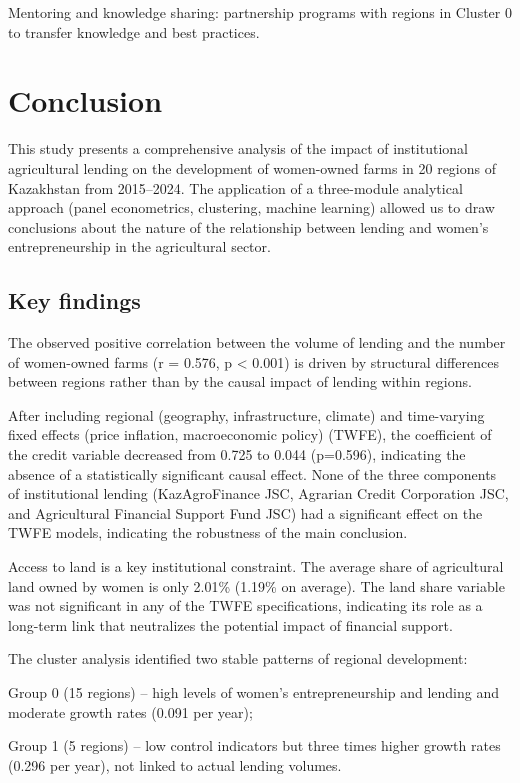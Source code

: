 ﻿\documentclass[pdflatex,sn-mathphys-ay]{sn-jnl}
\begin{document}
Mentoring and knowledge sharing: partnership programs with regions in
Cluster 0 to transfer knowledge and best practices.

\section{Conclusion}

This study presents a comprehensive analysis of the impact of
institutional agricultural lending on the development of women-owned
farms in 20 regions of Kazakhstan from 2015--2024. The
application of a three-module analytical approach (panel econometrics,
clustering, machine learning) allowed us to draw conclusions about the
nature of the relationship between lending and women's entrepreneurship
in the agricultural sector.

\subsection{Key findings}

The observed positive correlation between the volume of lending and the
number of women-owned farms (r = 0.576, p \textless{} 0.001) is driven
by structural differences between regions rather than by the causal
impact of lending within regions.

After including regional (geography, infrastructure, climate) and
time-varying fixed effects (price inflation, macroeconomic policy)
(TWFE), the coefficient of the credit variable decreased from 0.725 to
0.044 (p=0.596), indicating the absence of a statistically significant
causal effect. None of the three components of institutional lending
(KazAgroFinance JSC, Agrarian Credit Corporation JSC, and Agricultural
Financial Support Fund JSC) had a significant effect on the TWFE models,
indicating the robustness of the main conclusion.

Access to land is a key institutional constraint. The average share of
agricultural land owned by women is only 2.01\% (1.19\% on average). The
land share variable was not significant in any of the TWFE
specifications, indicating its role as a long-term link that neutralizes
the potential impact of financial support.

The cluster analysis identified two stable patterns of regional development:

Group 0 (15 regions) -- high levels of women's entrepreneurship and
lending and moderate growth rates (0.091 per year);

Group 1 (5 regions) -- low control indicators but three times higher
growth rates (0.296 per year), not linked to actual lending volumes.
\end{document}

